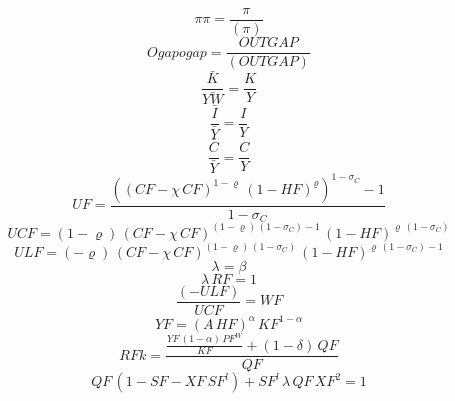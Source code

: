 \begin{dmath}
{\pi\pi}=\frac{{\pi}}{({\pi})}
\end{dmath}
\begin{dmath}
{Ogapogap}=\frac{{OUTGAP}}{({OUTGAP})}
\end{dmath}
\begin{dmath}
{\frac{\bar{K}}{\bar{YW}}}=\frac{{K}}{{Y}}
\end{dmath}
\begin{dmath}
{\frac{\bar{I}}{\bar{Y}}}=\frac{{I}}{{Y}}
\end{dmath}
\begin{dmath}
{\frac{\bar{C}}{\bar{Y}}}=\frac{{C}}{{Y}}
\end{dmath}
\begin{dmath}
{UF}=\frac{\left(\left({CF}-{{\chi}}\, {CF}\right)^{1-{{\varrho}}}\, \left(1-{HF}\right)^{{{\varrho}}}\right)^{1-{{\sigma_{C}}}}-1}{1-{{\sigma_{C}}}}
\end{dmath}
\begin{dmath}
{UCF}=\left(1-{{\varrho}}\right)\, \left({CF}-{{\chi}}\, {CF}\right)^{\left(1-{{\varrho}}\right)\, \left(1-{{\sigma_{C}}}\right)-1}\, \left(1-{HF}\right)^{{{\varrho}}\, \left(1-{{\sigma_{C}}}\right)}
\end{dmath}
\begin{dmath}
{ULF}=\left(-{{\varrho}}\right)\, \left({CF}-{{\chi}}\, {CF}\right)^{\left(1-{{\varrho}}\right)\, \left(1-{{\sigma_{C}}}\right)}\, \left(1-{HF}\right)^{{{\varrho}}\, \left(1-{{\sigma_{C}}}\right)-1}
\end{dmath}
\begin{dmath}
{\lambda}={{\beta}}
\end{dmath}
\begin{dmath}
{\lambda}\, {RF}=1
\end{dmath}
\begin{dmath}
\frac{\left(-{ULF}\right)}{{UCF}}={WF}
\end{dmath}
\begin{dmath}
{YF}=\left({A}\, {HF}\right)^{{{\alpha}}}\, {KF}^{1-{{\alpha}}}
\end{dmath}
\begin{dmath}
{RFk}=\frac{\frac{{YF}\, \left(1-{{\alpha}}\right)\, {PF^{W}}}{{KF}}+\left(1-{{\delta}}\right)\, {QF}}{{QF}}
\end{dmath}
\begin{dmath}
{QF}\, \left(1-{SF}-{XF}\, {SF^{l}}\right)+{SF^{l}}\, {\lambda}\, {QF}\, {XF}^{2}=1
\end{dmath}
